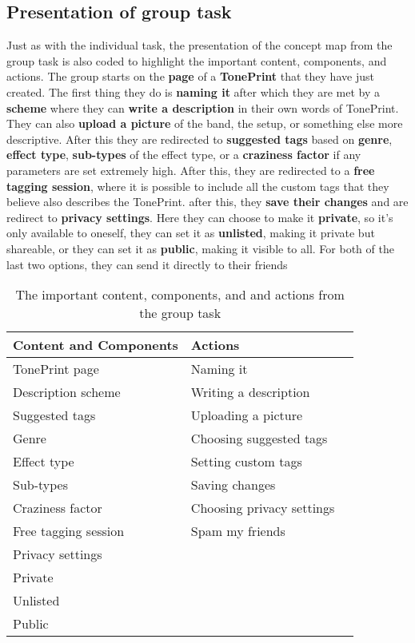 \subsection*{Presentation of group task}
\label{GroupTaskPresentation}
Just as with the individual task, the presentation of the concept map from the group task is also coded to highlight the important content, components, and actions. The group starts on the \textbf{page} of a \textbf{TonePrint} that they have just created. The first thing they do is \textbf{naming it} after which they are met by a \textbf{scheme} where they can \textbf{write a description} in their own words of TonePrint. They can also \textbf{upload a picture} of the band, the setup, or something else more descriptive. After this they are redirected to \textbf{suggested tags} based on \textbf{genre}, \textbf{effect type}, \textbf{sub-types} of the effect type, or a \textbf{craziness factor} if any parameters are set extremely high. After this, they are redirected to a \textbf{free tagging session}, where it is possible to include all the custom tags that they believe also describes the TonePrint. after this, they \textbf{save their changes} and are redirect to \textbf{privacy settings}. Here they can choose to make it \textbf{private}, so it's only available to oneself, they can set it as \textbf{unlisted}, making it private but shareable, or they can set it as \textbf{public}, making it visible to all. For both of the last two options, they can send it directly to their friends
%
\begin{table}[H]
\begin{minipage}[b]{\linewidth}\centering
	\begin{tabular} {|l|l|l|} \hline
		\rowcolor{xGray25} \textbf{Content and Components} & \textbf{Actions} \\  \hline
		TonePrint page & Naming it \\
		Description scheme & Writing a description \\
		Suggested tags & Uploading a picture \\
		Genre & Choosing suggested tags \\
		Effect type & Setting custom tags \\
		Sub-types & Saving changes \\
		Craziness factor & Choosing privacy settings \\
		Free tagging session & Spam my friends \\
		Privacy settings & \\
		Private & \\
		Unlisted & \\
		Public & \\ \hline
	\end{tabular}
	\caption{The important content, components, and and actions from the group task}
	\label{tab:GroupContentActions}
\end{minipage}
\end{table}
